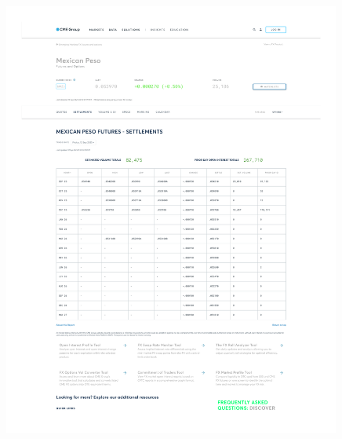 \documentclass[11pt,a4paper]{article} %
\begin{document}
\begin{figure}[h]
  \centering
  \includegraphics[width=0.99\textwidth]{appendix/MXNUSD12SEP.pdf}
  \label{fig:mxnusd_settlements}
\end{figure}
\end{document}

